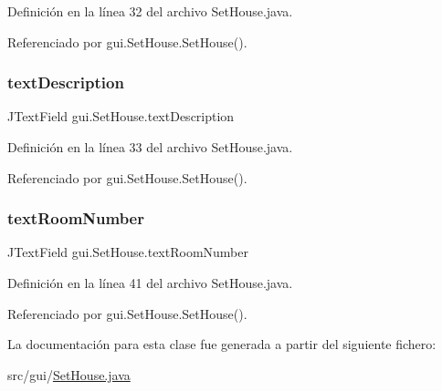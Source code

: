 Definición en la línea 32 del archivo Set\+House.\+java.



Referenciado por gui.\+Set\+House.\+Set\+House().

\mbox{\label{classgui_1_1_set_house_a54e03877cc31fe5cbc2513094e7fcc3d}} 
\subsubsection{\texorpdfstring{textDescription}{textDescription}}
{\footnotesize\ttfamily J\+Text\+Field gui.\+Set\+House.\+text\+Description\hspace{0.3cm}{\ttfamily [private]}}



Definición en la línea 33 del archivo Set\+House.\+java.



Referenciado por gui.\+Set\+House.\+Set\+House().

\mbox{\label{classgui_1_1_set_house_a34af222b11f96409a6b8124b9f86ca68}} 
\subsubsection{\texorpdfstring{textRoomNumber}{textRoomNumber}}
{\footnotesize\ttfamily J\+Text\+Field gui.\+Set\+House.\+text\+Room\+Number\hspace{0.3cm}{\ttfamily [private]}}



Definición en la línea 41 del archivo Set\+House.\+java.



Referenciado por gui.\+Set\+House.\+Set\+House().



La documentación para esta clase fue generada a partir del siguiente fichero\+:\begin{DoxyCompactItemize}
\item 
src/gui/\mbox{\hyperlink{_set_house_8java}{Set\+House.\+java}}\end{DoxyCompactItemize}
